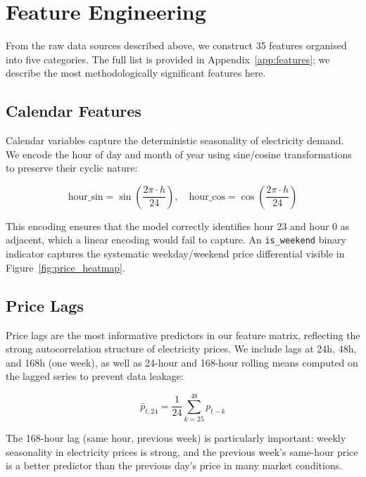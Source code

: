 \section{Feature Engineering}
\label{sec:features}

From the raw data sources described above, we construct 35 features organised into five categories. The full list is provided in Appendix~\ref{app:features}; we describe the most methodologically significant features here.

\subsection{Calendar Features}

Calendar variables capture the deterministic seasonality of electricity demand. We encode the hour of day and month of year using sine/cosine transformations to preserve their cyclic nature:

\begin{equation}
  \text{hour\_sin} = \sin\!\left(\frac{2\pi \cdot h}{24}\right), \quad
  \text{hour\_cos} = \cos\!\left(\frac{2\pi \cdot h}{24}\right)
\end{equation}

This encoding ensures that the model correctly identifies hour 23 and hour 0 as adjacent, which a linear encoding would fail to capture. An \texttt{is\_weekend} binary indicator captures the systematic weekday/weekend price differential visible in Figure~\ref{fig:price_heatmap}.

\subsection{Price Lags}

Price lags are the most informative predictors in our feature matrix, reflecting the strong autocorrelation structure of electricity prices. We include lags at 24h, 48h, and 168h (one week), as well as 24-hour and 168-hour rolling means computed on the lagged series to prevent data leakage:

\begin{equation}
  \bar{p}_{t, 24} = \frac{1}{24}\sum_{k=25}^{48} p_{t-k}
\end{equation}

The 168-hour lag (same hour, previous week) is particularly important: weekly seasonality in electricity prices is strong, and the previous week's same-hour price is a better predictor than the previous day's price in many market conditions.

